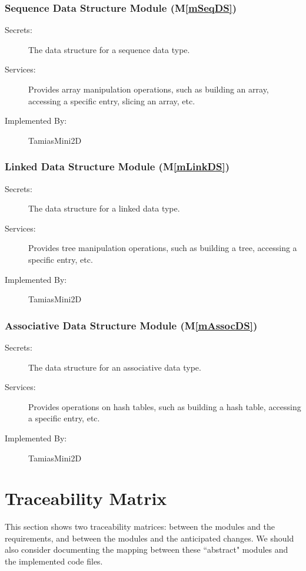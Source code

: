 \documentclass[12pt]{article}
\newcommand{\mref}[1]{M\ref{#1}}
\begin{document}
\subsubsection{Sequence Data Structure Module (\mref{mSeqDS})}

\begin{description}
\item[Secrets:] The data structure for a sequence data type.
\item[Services:] Provides array manipulation operations, such as building an array, accessing a specific entry, slicing an array, etc.
\item[Implemented By:] TamiasMini2D
\end{description}

\subsubsection{Linked Data Structure Module (\mref{mLinkDS})}

\begin{description}
\item[Secrets:] The data structure for a linked data type.
\item[Services:] Provides tree manipulation operations, such as building a tree, accessing a specific entry, etc.
\item[Implemented By:] TamiasMini2D
\end{description}

\subsubsection{Associative Data Structure Module (\mref{mAssocDS})}

\begin{description}
\item[Secrets:] The data structure for an associative data type.
\item[Services:] Provides operations on hash tables, such as building a hash table, accessing a specific entry, etc.
\item[Implemented By:] TamiasMini2D
\end{description}

\section{Traceability Matrix} \label{SecTM}

This section shows two traceability matrices: between the modules and the
requirements, and between the modules and the anticipated changes. We should also consider documenting the mapping between these ``abstract" modules and the implemented code files.
\end{document}
